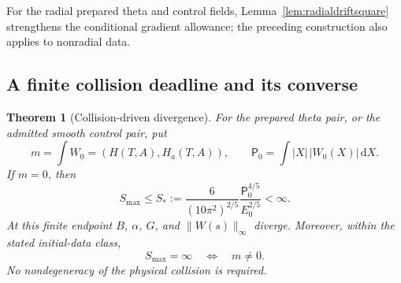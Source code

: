 \documentclass[11pt]{article}
\numberwithin{equation}{section}
\newtheorem{theorem}{Theorem}[section]
\newcommand{\dd}{\,\mathrm d}
\begin{document}
For the radial prepared theta and control fields,
Lemma~\ref{lem:radialdriftsquare} strengthens the conditional gradient
allowance; the preceding construction also applies to nonradial data.

\subsection{A finite collision deadline and its converse}

\begin{theorem}[Collision-driven divergence]\label{thm:feedbackdeadline}
For the prepared theta pair, or the admitted smooth control pair, put
\[
 m=\int W_0=(H(T,A),H_a(T,A)),\qquad
 \mathsf P_0=\int |X|\,|W_0(X)|\dd X.
\]
If $m=0$, then
\begin{equation}\label{eq:feedbackdeadline}
 S_{\max}\le S_*:=
 \frac{6}{(10\pi^2)^{2/5}}\frac{\mathsf P_0^{4/5}}{E_0^{2/5}}
 <\infty.
\end{equation}
At this finite endpoint $B$, $\alpha$, $G$, and
$\|W(s)\|_\infty$ diverge. Moreover, within the stated initial-data class,
\begin{equation}\label{eq:feedbackequivalence}
 S_{\max}=\infty\quad\Longleftrightarrow\quad m\ne0.
\end{equation}
No nondegeneracy of the physical collision is required.
\end{theorem}
\end{document}
